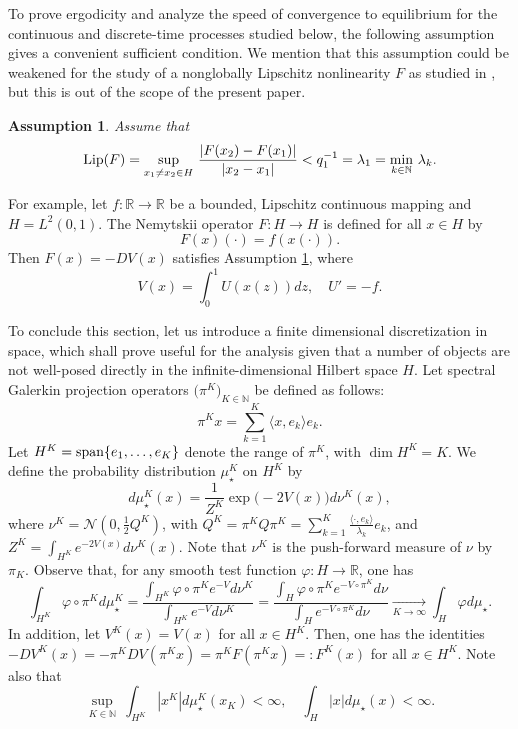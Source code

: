 \documentclass[11pt]{amsart}
\newcommand{\R}{\mathbb{R}}
\newcommand{\N}{\mathbb{N}}
\newtheorem{ass}{Assumption}
\begin{document}
To prove ergodicity and analyze the speed of convergence to equilibrium for the continuous and discrete-time processes studied below, the following assumption gives a convenient sufficient condition. We mention that this assumption could be weakened for the study of a nonglobally Lipschitz nonlinearity $F$ as studied in \cite{BG25}, but this is out of the scope of the present paper.
\begin{ass}\label{ass:AF}
Assume that
\[
{\rm Lip}(F)=\underset{x_1\neq x_2\in H}\sup~\frac{|F(x_2)-F(x_1)|}{|x_2-x_1|}<q_1^{-1}=\lambda_1=\underset{k\in\N}\min~\lambda_k.
\]
\end{ass}


For example, let $f:\R\to\R$ be a bounded, Lipschitz continuous mapping and $H=L^2(0,1)$. The Nemytskii operator $F:H\to H$ is defined for all $x\in H$ by
\begin{equation}
\label{equation:Nemytskii}
F(x)(\cdot)=f(x(\cdot)).
\end{equation}
Then $F(x)=-DV(x)$ satisfies Assumption \ref{ass:AF}, where
\[
V(x)=\int_{0}^{1}U(x(z))dz, \quad U'=-f.
\]






To conclude this section, let us introduce a finite dimensional discretization in space, which shall prove useful for the analysis given that a number of objects are not well-posed directly in the infinite-dimensional Hilbert space $H$. Let spectral Galerkin projection operators $\bigl(\pi^K\bigr)_{K\in\N}$ be defined as follows:
\begin{equation} \label{eq:defpiK}
\pi^Kx=\sum_{k=1}^{K}\langle x,e_k\rangle e_k.
\end{equation}
Let $H^K={\rm span}\{e_1,\ldots,e_K\}$ denote the range of $\pi^K$, with $\dim H^K=K$.
%
We define the probability distribution $\mu_\star^K$ on $H^K$ by
\begin{equation} \label{eq:defmustarK}
d\mu_\star^K(x)=\frac{1}{Z^K}\exp\bigl(-2V(x)\bigr)d\nu^K(x),
\end{equation}
where $\nu^K=\mathcal{N}(0,\frac12 Q^K)$, with $Q^K=\pi^KQ\pi^K=\sum_{k=1}^{K}\frac{\langle \cdot,e_k\rangle}{\lambda_k}e_k$, and $Z^K=\int_{H^K}e^{-2V(x)}d\nu^K(x)$. Note that $\nu^K$ is the push-forward measure of $\nu$ by $\pi_K$.
%
Observe that, for any smooth test function $\varphi:H\to\R$, one has
\[
\int_{H^K}\varphi\circ \pi^K d\mu_\star^K=\frac{\int_{H^K}\varphi\circ \pi^K e^{-V}d\nu^K}{\int_{H^K}e^{-V}d\nu^K}=\frac{\int_{H}\varphi\circ \pi^K e^{-V\circ \pi^K}d\nu}{\int_{H}e^{-V\circ \pi^K}d\nu}\underset{K\to\infty}\to \int_{H}\varphi d\mu_\star.
\]
In addition, let $V^K(x)=V(x)$ for all $x\in H^K$. Then, one has the identities $-DV^K(x)=-\pi^K DV(\pi^Kx)=\pi^K F(\pi^Kx)=:F^K(x)$ for all $x\in H^K$.
%
Note also that
\[
\underset{K\in\N}\sup~\int_{H^K}|x^K| d\mu_\star^K(x_K)<\infty, \quad \int_{H}|x| d\mu_\star(x)<\infty.
\]
\end{document}
